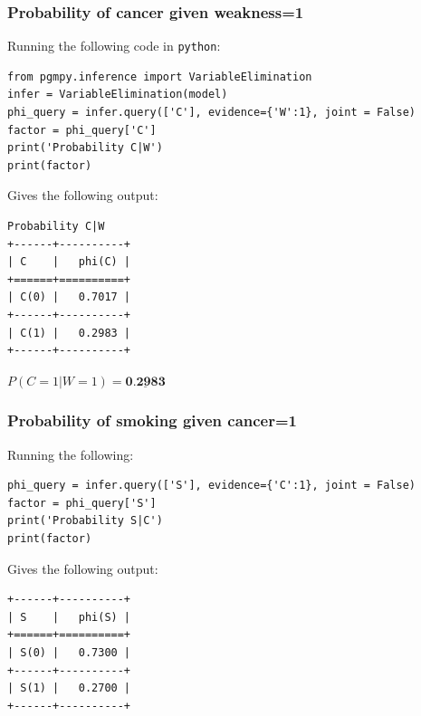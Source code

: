 \documentclass[12pt, letterpaper]{article}
\begin{document}
\subsubsection{Probability of cancer given weakness=1}

Running the following code in \texttt{python}:

\begin{mdframed}[backgroundcolor=bg]
\begin{verbatim}
from pgmpy.inference import VariableElimination
infer = VariableElimination(model)
phi_query = infer.query(['C'], evidence={'W':1}, joint = False)
factor = phi_query['C']
print('Probability C|W')
print(factor)
\end{verbatim}
\end{mdframed}

Gives the following output:

\begin{mdframed}[backgroundcolor=bg]
\begin{lstlisting}
Probability C|W
+------+----------+
| C    |   phi(C) |
+======+==========+
| C(0) |   0.7017 |
+------+----------+
| C(1) |   0.2983 |
+------+----------+
\end{lstlisting}
\end{mdframed}

$P(C=1|W=1)=\underline{\textbf{0.2983}}$

\subsubsection{Probability of smoking given cancer=1}

Running the following:

\begin{mdframed}[backgroundcolor=bg]
\begin{verbatim} 
phi_query = infer.query(['S'], evidence={'C':1}, joint = False)
factor = phi_query['S']
print('Probability S|C')
print(factor)
\end{verbatim}
\end{mdframed}

Gives the following output:

\begin{mdframed}[backgroundcolor=bg]
\begin{lstlisting}
+------+----------+
| S    |   phi(S) |
+======+==========+
| S(0) |   0.7300 |
+------+----------+
| S(1) |   0.2700 |
+------+----------+
\end{lstlisting}
\end{mdframed}
\end{document}
